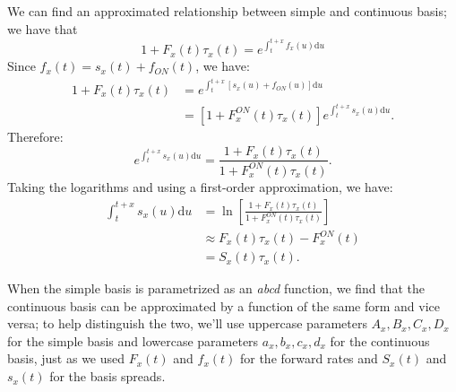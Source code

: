 \documentclass{article}
\begin{document}
We can find an approximated relationship between simple and continuous basis; we have that
\begin{equation}
1 + F_x(t) \tau_x(t) = e^{\int_t^{t+x} f_x(u) \mathrm{d}u}
\end{equation}
Since $f_x(t) = s_x(t) + f_{ON}(t)$, we have:
\begin{equation}
\begin{split}
1 + F_x(t) \tau_x(t) &= e^{\int_t^{t+x} [s_x(u) + f_{ON}(u)] \mathrm{d}u}\\
&= [1 + F_x^{ON}(t) \tau_x(t)]e^{\int_t^{t+x} s_x(u) \mathrm{d}u}.
\end{split}
\end{equation}
Therefore:
\begin{equation}
e^{\int_t^{t+x} s_x(u) \mathrm{d}u} = \frac{1+ F_x(t) \tau_x(t)}{1+ F_x^{ON}(t) \tau_x(t)}. 
\end{equation}
Taking the logarithms and using a first-order approximation, we have:
\begin{equation}
\label{simple-vs-continuous}
\begin{split}
\int_t^{t+x} s_x(u) \mathrm{d}u &= \ln{\left[\frac{1+ F_x(t) \tau_x(t)}{1+ F_x^{ON}(t) \tau_x(t)}\right]}\\ 
&\approx F_x(t) \tau_x(t) - F_x^{ON}(t)\\
&= S_x(t) \tau_x(t).
\end{split}
\end{equation}

When the simple basis is parametrized as an \textit{abcd} function, we find that the continuous basis can be approximated by a function of the same form and vice versa; to help distinguish the two, we'll use uppercase parameters $A_x, B_x, C_x, D_x$ for the simple basis and lowercase parameters $a_x, b_x, c_x, d_x$ for the continuous basis, just as we used $F_x(t)$ and $f_x(t)$ for the forward rates and $S_x(t)$ and $s_x(t)$ for the basis spreads.
\end{document}
